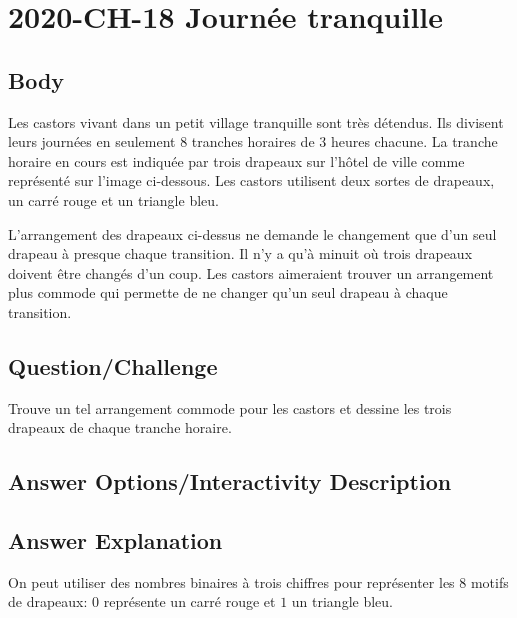 \documentclass[a4paper,11pt]{report}
\newcommand{\taskGraphicsFolder}{..}
\begin{document}
\section*{\centering{} 2020-CH-18 Journée tranquille}


\subsection*{Body}

Les castors vivant dans un petit village tranquille sont très détendus. Ils divisent leurs journées en seulement $8$ tranches horaires de $3$ heures chacune. La tranche horaire en cours est indiquée par trois drapeaux sur l’hôtel de ville comme représenté sur l’image ci-dessous. Les castors utilisent deux sortes de drapeaux, un carré rouge et un triangle bleu.

L’arrangement des drapeaux ci-dessus ne demande le changement que d’un seul drapeau à presque chaque transition. Il n’y a qu’à minuit où trois drapeaux doivent être changés d’un coup. Les castors aimeraient trouver un arrangement plus commode qui permette de ne changer qu’un seul drapeau à chaque transition.

{\em

\subsection*{Question/Challenge}

Trouve un tel arrangement commode pour les castors et dessine les trois drapeaux de chaque tranche horaire.

{\centering%
\par}

}\begingroup
\renewcommand{\arraystretch}{1.5}
\subsection*{Answer Options/Interactivity Description}



\endgroup

\subsection*{Answer Explanation}

On peut utiliser des nombres binaires à trois chiffres pour représenter les $8$ motifs de drapeaux: $0$ représente un carré rouge et $1$ un triangle bleu.
\end{document}
